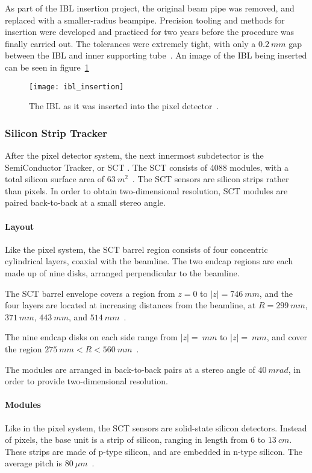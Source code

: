 As part of the IBL insertion project, the original beam pipe was removed, and replaced with a smaller-radius beampipe.
Precision tooling and methods for insertion were developed and practiced for two years before the procedure was finally carried out.
The tolerances were extremely tight, with only a $0.2~mm$ gap between the IBL and inner supporting tube~\cite{ibl-website}.
An image of the IBL being inserted can be seen in figure~\ref{fig:ibl_insertion}

\begin{figure}[!ht]\centering
\texttt{[image: ibl\_insertion]}
\caption{The IBL as it was inserted into the pixel detector~\cite{ibl-website}.}
\label{fig:ibl_insertion}
\end{figure}

\subsubsection{Silicon Strip Tracker}\label{subsubsec:sct}

After the pixel detector system, the next innermost subdetector is the SemiConductor Tracker, or SCT .
The SCT consists of 4088 modules, with a total silicon surface area of $63~m^2$~\cite{atlas-detector-2008}.
The SCT sensors are silicon strips rather than pixels.
In order to obtain two-dimensional resolution, SCT modules are paired back-to-back at a small stereo angle.

\paragraph{Layout}
Like the pixel system, the SCT barrel region consists of four concentric cylindrical layers, coaxial with the beamline.
The two endcap regions are each made up of nine disks, arranged perpendicular to the beamline.

The SCT barrel envelope covers a region from $z = 0$ to $|z|  = 746~mm$,
and the four layers are located at increasing distances from the beamline,
at $R = 299~mm$, $371~mm$, $443~mm$, and $514~mm$~\cite{sct-barrel-2006}.

The nine endcap disks on each side range from $|z| = ~mm$ to $|z| = ~mm$,
and cover the region $275~mm < R < 560~mm$~\cite{atlas-detector-2008}.

The modules are arranged in back-to-back pairs at a stereo angle of $40~mrad$, in order to provide two-dimensional resolution.

\paragraph{Modules}
Like in the pixel system, the SCT sensors are solid-state silicon detectors.
Instead of pixels, the base unit is a strip of silicon, ranging in length from $6$ to $13~cm$.
These strips are made of p-type silicon, and are embedded in n-type silicon. The average pitch is $80~\mu m$~\cite{sct-2010}.


